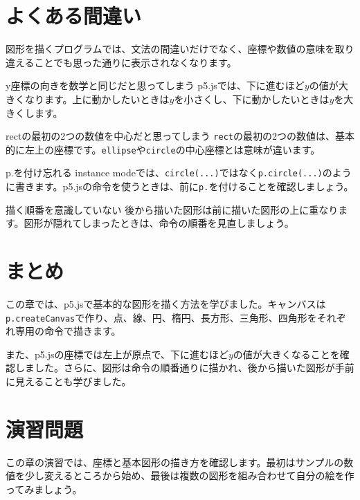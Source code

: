 \section{よくある間違い}

図形を描くプログラムでは、文法の間違いだけでなく、座標や数値の意味を取り違えることでも思った通りに表示されなくなります。

\begin{mistakebox}{y座標の向きを数学と同じだと思ってしまう}
p5.jsでは、下に進むほど$y$の値が大きくなります。上に動かしたいときは$y$を小さくし、下に動かしたいときは$y$を大きくします。
\end{mistakebox}

\begin{mistakebox}{rectの最初の2つの数値を中心だと思ってしまう}
\texttt{rect}の最初の2つの数値は、基本的に左上の座標です。\texttt{ellipse}や\texttt{circle}の中心座標とは意味が違います。
\end{mistakebox}

\begin{mistakebox}{p.を付け忘れる}
instance modeでは、\texttt{circle(...)}ではなく\texttt{p.circle(...)}のように書きます。p5.jsの命令を使うときは、前に\texttt{p.}を付けることを確認しましょう。
\end{mistakebox}

\begin{mistakebox}{描く順番を意識していない}
後から描いた図形は前に描いた図形の上に重なります。図形が隠れてしまったときは、命令の順番を見直しましょう。
\end{mistakebox}

\section{まとめ}

この章では、p5.jsで基本的な図形を描く方法を学びました。キャンバスは\texttt{p.createCanvas}で作り、点、線、円、楕円、長方形、三角形、四角形をそれぞれ専用の命令で描きます。

また、p5.jsの座標では左上が原点で、下に進むほど$y$の値が大きくなることを確認しました。さらに、図形は命令の順番通りに描かれ、後から描いた図形が手前に見えることも学びました。

\section{演習問題}

この章の演習では、座標と基本図形の描き方を確認します。最初はサンプルの数値を少し変えるところから始め、最後は複数の図形を組み合わせて自分の絵を作ってみましょう。

